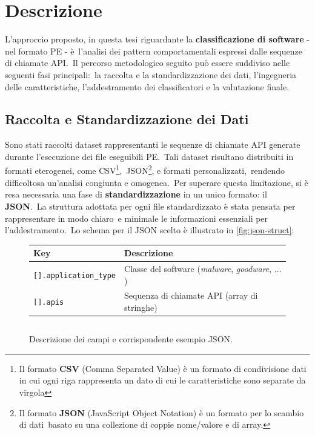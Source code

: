 \section{Descrizione}

L'approccio proposto, in questa tesi riguardante la \textbf{classificazione di software} - nel formato PE - è\
l'analisi dei pattern comportamentali espressi dalle sequenze di chiamate API.\
Il percorso metodologico seguito può essere suddiviso nelle seguenti fasi principali:\
la raccolta e la standardizzazione dei dati, l'ingegneria delle caratteristiche, l'addestramento dei classificatori
e la valutazione finale.

\subsection{Raccolta e Standardizzazione dei Dati}

Sono stati raccolti dataset rappresentanti le sequenze di chiamate API generate durante l'esecuzione dei file eseguibili PE.\
Tali dataset risultano distribuiti in formati eterogenei, come CSV\footnote{Il formato \textbf{CSV} (Comma Separated Value) è un formato di condivisione dati in cui ogni
    riga rappresenta un dato di cui le caratteristiche sono separate da virgola },\
JSON\footnote{Il formato \textbf{JSON} (JavaScript Object Notation) è un formato per lo scambio di dati\
    basato su una collezione di coppie nome/valore e di array.}, e formati personalizzati,\
rendendo difficoltosa un'analisi congiunta e omogenea.\
Per superare questa limitazione, si è resa necessaria una fase di \textbf{standardizzazione} in un unico formato:
il \textbf{JSON}.\
La struttura adottata per ogni file standardizzato è stata pensata per rappresentare in modo chiaro\
e minimale le informazioni essenziali per l'addestramento.\
Lo schema per il JSON scelto è illustrato in \autoref{fig:json-struct}:

\begin{figure}[h!]
    \centering
    \renewcommand{\arraystretch}{1.3}
    \begin{tabular}{p{0.25\textwidth} p{0.65\textwidth}}
        \toprule
        \textbf{Key}                  & \textbf{Descrizione}                                           \\
        \midrule
        \texttt{[].application\_type} & Classe del software (\emph{malware}, \emph{goodware}, $\dots$) \\
        \texttt{[].apis}              & Sequenza di chiamate API (array di stringhe)                   \\
        \bottomrule
    \end{tabular}

    \vspace{4mm} %

    \inputminted[fontsize=\small]{json}{approccio-proposto/example.json}
    \caption{Descrizione dei campi e corrispondente esempio JSON.}
    \label{fig:json-struct}
\end{figure}

